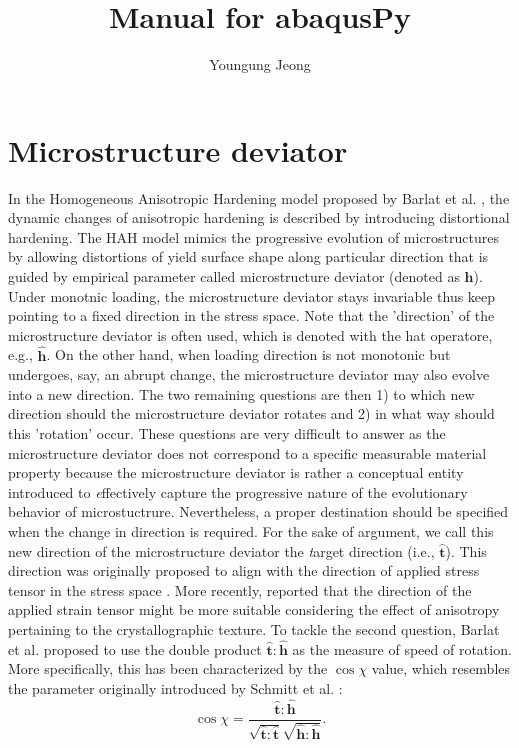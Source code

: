 \documentclass[12pt]{amsart}
\author{Youngung Jeong}
\title{Manual for abaqusPy}
\begin{document}
\pgfplotsset{compat=1.14}
\section{Microstructure deviator}
\label{sec:micd}
In the Homogeneous Anisotropic Hardening model proposed by Barlat et al. \cite{barlat2011alternative}, the dynamic changes of anisotropic hardening is described by introducing distortional hardening.
The HAH model mimics the progressive evolution of microstructures by allowing distortions of yield surface shape along particular direction that is guided by empirical parameter called microstructure deviator (denoted as $\mathbf{h}$).
Under monotnic loading, the microstructure deviator stays invariable thus keep pointing to a fixed direction in the stress space.
Note that the 'direction' of the microstructure deviator is often used, which is denoted with the hat operatore, e.g., $\hat{\mathbf{h}}$.
On the other hand, when loading direction is not monotonic but undergoes, say, an abrupt change, the microstructure deviator may also evolve into a new direction.
The two remaining questions are then 1) to which new direction should the microstructure deviator rotates and 2) in what way should this 'rotation' occur.
These questions are very difficult to answer as the microstructure deviator does not correspond to a specific measurable material property because the microstructure deviator is rather a conceptual entity introduced to {\emph effectively} capture the progressive nature of the evolutionary behavior of microstuctrure.
\newline
Nevertheless, a proper destination should be specified when the change in direction is required.
For the sake of argument, we call this new direction of the microstructure deviator the {\emph target} direction (i.e., $\hat{\mathbf{t}}$).
This direction was originally proposed to align with the direction of applied stress tensor in the stress space \cite{barlat2011alternative}.
More recently, \cite{Jeong2016} reported that the direction of the applied strain tensor might be more suitable considering the effect of anisotropy pertaining to the crystallographic texture.
To tackle the second question, Barlat et al. \cite{barlat2011alternative} proposed to use the double product $\hat{\mathbf{t}}:\hat{\mathbf{h}}$ as the measure of speed of rotation.
More specifically, this has been characterized by the $\cos \chi$ value, which resembles the parameter originally introduced by Schmitt et al. \cite{schmitt1994parameter}:
\begin{equation}
  \label{eq:coschi}
\cos\chi = \frac{\hat{\mathbf{t}}:\hat{\mathbf{h}} }{ \sqrt{\hat{\mathbf{t}}:\hat{\mathbf{t}}}\sqrt{\hat{\mathbf{h}}:\hat{\mathbf{h}}}}.
\end{equation}
\end{document}
